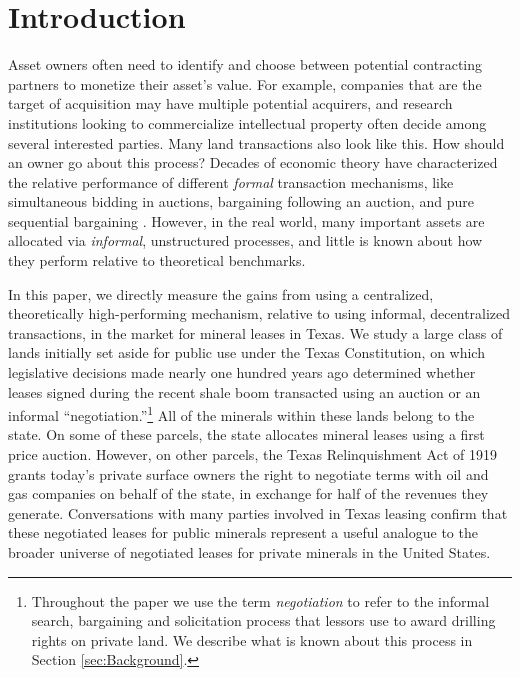 \documentclass[12pt]{article}
\begin{document}
\newpage

\section{Introduction} \label{sec:Intro}

Asset owners often need to identify and choose between potential contracting partners to monetize their asset's value. For example, companies that are the target of acquisition may have multiple potential acquirers, and research institutions looking to commercialize intellectual property often decide among several interested parties. Many land transactions also look like this. How should an owner go about this process?  Decades of economic theory have characterized the relative performance of different \textit{formal} transaction mechanisms, like simultaneous bidding in auctions, bargaining following an auction, and pure sequential bargaining \citep{bulow_auctions_1996, bulow_why_2009, roberts_when_2013}.  However, in the real world, many important assets are allocated via \textit{informal}, unstructured processes, and little is known about how they perform relative to theoretical benchmarks.

In this paper, we directly measure the gains from using a centralized, theoretically high-performing mechanism, relative to using informal, decentralized transactions, in the market for mineral leases in Texas. We study a large class of lands initially set aside for public use under the Texas Constitution, on which legislative decisions made nearly one hundred years ago determined whether leases signed during the recent shale boom transacted using an auction or an informal ``negotiation.''\footnote{Throughout the paper we use the term \textit{negotiation} to refer to the informal search, bargaining and solicitation process that lessors use to award drilling rights on private land. We describe what is known about this process in Section \ref{sec:Background}.} All of the minerals within these lands belong to the state. On some of these parcels, the state allocates mineral leases using a first price auction. However, on other parcels, the Texas Relinquishment Act of 1919 grants today's private surface owners the right to negotiate terms with oil and gas companies on behalf of the state, in exchange for half of the revenues they generate.  Conversations with many parties involved in Texas leasing confirm that these negotiated leases for public minerals represent a useful analogue to the broader universe of negotiated leases for private minerals in the United States. 
\end{document}
